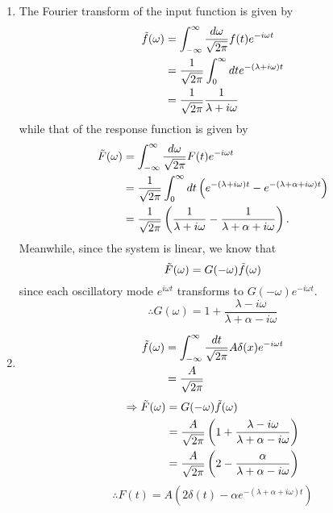 \item

\begin{enumerate}[wide, labelindent = 0pt, label = (\alph*)]
\item
The Fourier transform of the input function is given by
\begin{align*}
    \Tilde{f}(\omega)
    &= \int_{-\infty}^\infty \frac{d\omega}{\sqrt{2\pi}} f(t) e^{-i\omega t} \\
    &= \frac{1}{\sqrt{2\pi}} \int_0^\infty dt e^{-(\lambda + i\omega) t} \\
    &= \frac{1}{\sqrt{2\pi}} \frac{1}{\lambda + i\omega}
\end{align*}
while that of the response function is given by
\begin{align*}
    \Tilde{F}(\omega)
    &= \int_{-\infty}^\infty \frac{d\omega}{\sqrt{2\pi}} F(t) e^{-i\omega t} \\
    &= \frac{1}{\sqrt{2\pi}} \int_0^\infty dt \left(
        e^{-(\lambda + i\omega)t} - e^{-(\lambda + \alpha + i\omega)t}
    \right) \\
    & = \frac{1}{\sqrt{2\pi}} \left(
        \frac{1}{\lambda + i\omega} - \frac{1}{\lambda + \alpha + i\omega}
    \right).
\end{align*}
Meanwhile, since the system is linear, we know that
\[
    \Tilde{F}(\omega) = G(-\omega) \Tilde{f}(\omega)
\]
since each oscillatory mode $e^{i\omega t}$ transforms to $G(-\omega) e^{-i\omega t}$.
\[
    \therefore G(\omega) = 1 + \frac{\lambda - i\omega}{\lambda + \alpha - i\omega}
\]

\item
\begin{align*}
    \Tilde{f}(\omega)
    &= \int_{-\infty}^\infty \frac{dt}{\sqrt{2\pi}} A \delta(x) e^{-i\omega t} \\
    &= \frac{A}{\sqrt{2\pi}}
\end{align*}
\begin{align*}
    \Rightarrow \Tilde{F}(\omega)
    &= G(-\omega) \Tilde{f}(\omega) \\
    &= \frac{A}{\sqrt{2\pi}} \left(1 + \frac{\lambda - i\omega}{\lambda + \alpha - i\omega} \right) \\
    &= \frac{A}{\sqrt{2\pi}} \left(2 - \frac{\alpha}{\lambda + \alpha - i\omega} \right)
\end{align*}
\[
    \therefore F(t)
    = A \left( 2\delta(t) - \alpha e^{-(\lambda + \alpha + i\omega)t} \right)
\]

\end{enumerate}